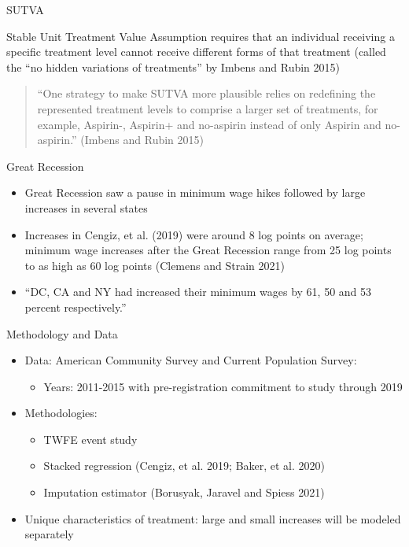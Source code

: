 \documentclass{beamer}
\begin{document}
\begin{frame}{SUTVA}	

Stable Unit Treatment Value Assumption requires that an individual receiving a specific treatment level cannot receive different forms of that treatment (called the ``no hidden variations of treatments'' by Imbens and Rubin 2015)

\bigskip

\begin{quote}
``One strategy to make SUTVA more plausible relies on redefining the represented treatment levels to comprise a larger set of treatments, for example, Aspirin-, Aspirin+ and no-aspirin instead of only Aspirin and no-aspirin.'' (Imbens and Rubin 2015)
\end{quote}

\end{frame}


\begin{frame}{Great Recession}

\begin{itemize}
\item Great Recession saw a pause in minimum wage hikes followed by large increases in several states
\item Increases in Cengiz, et al. (2019) were around 8 log points on average; minimum wage increases after the Great Recession range from 25 log points to as high as 60 log points (Clemens and Strain 2021)
\item ``DC, CA and NY had increased their minimum wages by 61, 50 and 53 percent respectively.''
\end{itemize}

\end{frame}



\begin{frame}{Methodology and Data}

\begin{itemize}
\item Data: American Community Survey and Current Population Survey: 
	\begin{itemize}
	\item Years: 2011-2015 with pre-registration commitment to study through 2019
	\end{itemize}
\item Methodologies:
	\begin{itemize}
	\item TWFE event study
	\item Stacked regression (Cengiz, et al. 2019; Baker, et al. 2020)
	\item Imputation estimator (Borusyak, Jaravel and Spiess 2021)
	\end{itemize}
\item Unique characteristics of treatment: large and small increases will be modeled separately
\end{itemize}

\end{frame}
\end{document}
